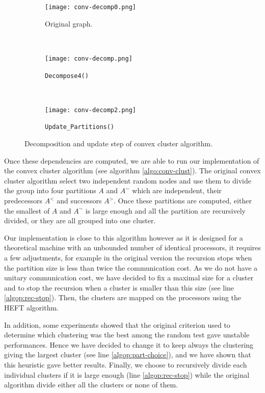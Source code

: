 \documentclass[10pt, conference, compsocconf,pdftex,dvipsnames]{IEEEtran}
\begin{document}
\begin{figure}[t!]
    \centering
    \begin{subfigure}{0.24\textwidth}
        \centering
        \texttt{[image: conv-decomp0.png]}
        \caption{Original graph.}
        \label{fig:conv-decomp0}
    \end{subfigure}
    ~
    \begin{subfigure}{0.27\textwidth}
        \centering
        \texttt{[image: conv-decomp.png]}
        \caption{\texttt{Decompose4()}}
        \label{fig:conv-decomp1}
    \end{subfigure}
    ~
    \begin{subfigure}{0.27\textwidth}
        \centering
        \texttt{[image: conv-decomp2.png]}
        \caption{\texttt{Update\_Partitions()}}
        \label{fig:conv-decomp2}
    \end{subfigure}
    \caption{Decomposition and update step of convex cluster algorithm.}
    \label{fig:conv-decomp}
\end{figure}


Once these dependencies are computed, we are able to run our implementation of
the convex cluster algorithm (see algorithm \ref{algo:conv-clust}). The
original convex cluster algorithm select two independent random nodes and use
them to divide the group into four partitions $A$ and $A^{\sim}$ which are
independent, their predecessors $A^<$ and successors $A^>$. Once these
partitions are computed, either the smallest of $A$ and $A^{\sim}$ is large
enough and all the partition are recursively divided, or they are all grouped
into one cluster. 

Our implementation is close to this algorithm however as it is designed for a
theoretical machine with an unbounded number of identical processors, it
requires a few adjustments, for example in the original version the recursion
stops when the partition size is less than twice the communication cost. As we
do not have a unitary communication cost, we have decided to fix a maximal
size for a cluster and to stop the recursion when a cluster is smaller than
this size (see line \ref{algop:rec-stop}). Then, the clusters are mapped on the
processors using the HEFT algorithm. 

In addition, some experiments showed that the original criterion used to
determine which clustering was the best among the random test gave unstable
performances. Hence we have decided to change it to keep always the clustering
giving the largest cluster (see line \ref{algop:part-choice}), and we have
shown that this heuristic gave better results. Finally, we choose to
recursively divide each individual clusters if it is large enough (line
\ref{algop:rec-stop}) while the original algorithm divide either all the
clusters or none of them.
\end{document}
